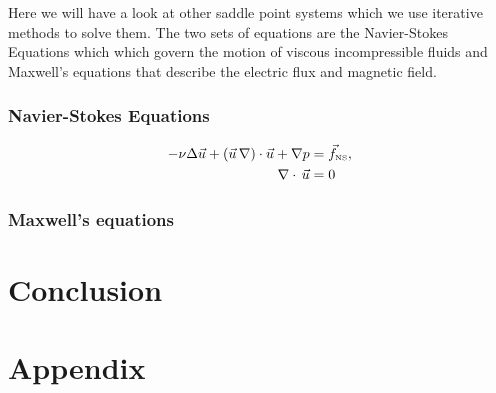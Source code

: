 \documentclass[11pt]{article}
\numberwithin{equation}{section}    %
\renewcommand{\div}{\nabla\cdot\,}
\newcommand{\U}{\vec u}
\newcommand{\me}{Maxwell's equations }
\newcommand{\ns}{Navier-Stokes Equations }
\begin{document}
Here we will have a look at other saddle point systems which we use iterative methods to solve them. The two sets of equations are the \ns which which govern the motion of viscous incompressible fluids and \me that describe the electric flux and magnetic field.

\subsubsection{\ns}



\begin{equation} \label{eq:NS}
    \begin{aligned}
        -\nu \Delta \U+ (\U \, \nabla)\cdot \U + \nabla p &= \vec f_{\mbox{\tiny{NS}}},\\
        \div \U     &= 0
    \end{aligned}
\end{equation}


\subsubsection{\me}



\section{Conclusion}



\section{Appendix}
\end{document}
